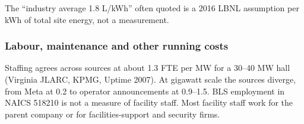 The ``industry average 1.8 L/kWh'' often quoted is a 2016 LBNL assumption per kWh of total site
energy, not a measurement.

\subsubsection{Labour, maintenance and other running costs}

\begin{table}[ht]\centering\small
\caption{Facility running costs other than electricity, \$k per MW of IT load per year}\label{tab:opex}
\end{table}

Staffing agrees across sources at about 1.3 FTE per MW for a 30--40 MW hall (Virginia JLARC,
KPMG, Uptime 2007). At gigawatt scale the sources diverge, from Meta at 0.2 to operator
announcements at 0.9--1.5. BLS employment in NAICS 518210 is not a measure of facility staff.
Most facility staff work for the parent company or for facilities-support and security firms.

